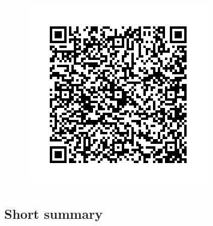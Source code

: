 \documentclass[a4paper,oneside,10pt]{article}
\begin{document}
\begin{figure}[hbt!]
	\centering
	\includegraphics[scale=0.315]{qrcode.png}%
\end{figure}

\subsection*{Short summary}
\end{document}
